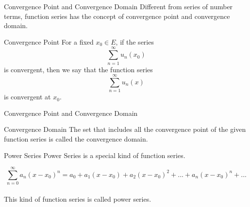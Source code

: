 \documentclass{beamer}
\begin{document}
\begin{frame}{Convergence Point and Convergence Domain}
    Different from series of number terms, function series has the concept of convergence point and convergence domain.
    \begin{block}{Convergence Point}
        For a fixed $x_0 \in E$, if the series $$\sum\limits_{n=1}^{\infty}u_n(x_0)$$is convergent, then we say that the function series $$\sum\limits_{n=1}^{\infty}u_n(x)$$ is convergent at $x_0$.
    \end{block}
\end{frame}
\begin{frame}{Convergence Point and Convergence Domain}
    \begin{block}{Convergence Domain}
    The set that includes all the convergence point of the given function series is called the convergence domain.
    \end{block}
\end{frame}
\begin{frame}{Power Series}
    Power Series is a special kind of function series.
    \begin{block}
    $$\sum\limits_{n=0}^{\infty} a_n(x-x_0)^n= a_0+ a_1 (x-x_0)+ a_2(x-x_0)^2 + ...+a_n(x-x_0)^n+...$$\\
    This kind of function series is called power series.
    \end{block}
    
\end{frame}
\end{document}

